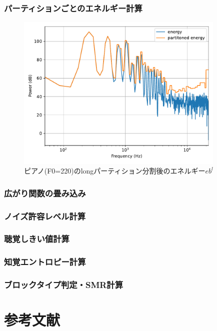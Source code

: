 \documentclass[14pt,xcolor=dvipsnames,table,dvipdfmx]{beamer}
\begin{document}
\begin{frame}[c]
    \frametitle{パーティションごとのエネルギー計算}
    \begin{figure}
        \includegraphics[width=100mm]{./figs/psyco_analyze_partitioned_energy.pdf}
        \caption*{ピアノ(F0=220)のlongパーティション分割後のエネルギー$eb^{l}$}
    \end{figure}
\end{frame}

\begin{frame}[c]
    \frametitle{広がり関数の畳み込み}
\end{frame}

\begin{frame}[c]
    \frametitle{ノイズ許容レベル計算}
\end{frame}

\begin{frame}[c]
    \frametitle{聴覚しきい値計算}
\end{frame}

\begin{frame}[c]
    \frametitle{知覚エントロピー計算}
\end{frame}

\begin{frame}[c]
    \frametitle{ブロックタイプ判定・SMR計算}
\end{frame}

\appendix

\section{参考文献}
\end{document}
